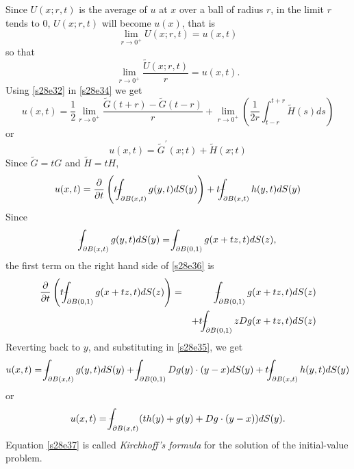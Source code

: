 \documentclass{article}
\newcommand{\fint}{\mbox{--}\mkern-16mu\int}
\theoremstyle{plain}
\numberwithin{thm}{section}
\theoremstyle{plain}
\numberwithin{prop}{section}
\theoremstyle{definition}
\numberwithin{defn}{section}
\theoremstyle{remark}
\numberwithin{equation}{section}
\begin{document}
Since $U(x; r, t)$ is the average of $u$ at $x$ over a ball of radius $r$, in the limit $r$ tends to $0$, 
$U(x; r,t)$ will become $u(x)$, that is
\begin{equation}\label{s28e33}
\lim_{r \rightarrow 0^+}U(x; r, t) = u(x, t)
\end{equation}
so that\begin{equation}\label{s28e34}
\lim_{r \rightarrow 0^+}\frac{\tilde{U}(x; r, t)}{r} = u(x, t).
\end{equation}
Using \eqref{s28e32} in \eqref{s28e34} we get
\[
u(x,t) = \frac{1}{2}\lim_{r \rightarrow 0^+}\frac{\tilde{G}(t+r)-\tilde{G}(t-r)}{r} + 
\lim_{r \rightarrow 0^+}\left(\frac{1}{2r}\int_{t-r}^{t+r}\tilde{H}(s)ds\right)
\]
or
\[
u(x,t) = \tilde{G}^\prime(x;t) + \tilde{H}(x;t)
\]
Since $\tilde{G} = tG$ and $\tilde{H} = tH$,
\begin{equation}\label{s28e35}
u(x,t) = \frac{\partial}{\partial t}\left(t\fint_{\partial B(x,t)}g(y, t)dS(y)\right) + 
t\fint_{\partial B(x,t)}h(y, t)dS(y)
\end{equation}
Since
\begin{equation}\label{s28e36}
\fint_{\partial B(x,t)}g(y, t)dS(y) = \fint_{\partial B(0,1)}g(x+tz, t)dS(z),
\end{equation}
the first term on the right hand side of \eqref{s28e36} is
\begin{eqnarray*}
\frac{\partial}{\partial t}\left(t\fint_{\partial B(0,1)}g(x+tz, t)dS(z)\right) &=& 
\fint_{\partial B(0,1)}g(x+tz, t)dS(z) \\
& & + t\fint_{\partial B(0,1)}zDg(x+tz, t)dS(z)
\end{eqnarray*}
Reverting back to $y$, and substituting in \eqref{s28e35}, we get
\[
u(x,t) = \fint_{\partial B(x,t)}g(y, t)dS(y) + \fint_{\partial B(0,1)} Dg(y)\cdot(y-x)dS(y) + 
t\fint_{\partial B(x,t)}h(y, t)dS(y)
\]
or
\begin{equation}\label{s28e37}
u(x,t) = \fint_{\partial B(x,t)} (th(y) + g(y) + Dg\cdot(y-x))dS(y).
\end{equation}
Equation \eqref{s28e37} is called \emph{Kirchhoff's formula} for the solution of the initial-value problem.
\end{document}
